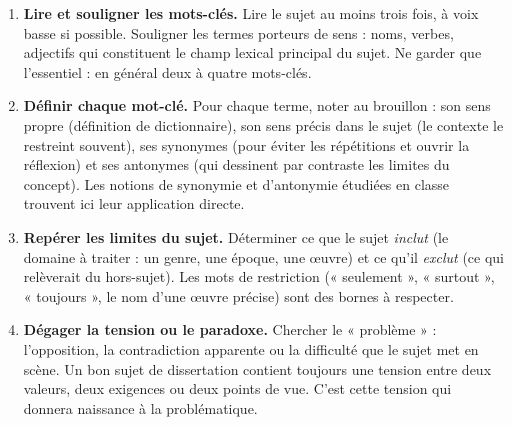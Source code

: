 \documentclass[11pt]{article}
\begin{document}
\begin{methode}
\begin{enumerate}
\item \textbf{Lire et souligner les mots-clés.} Lire le sujet au moins trois fois, à voix basse si possible. Souligner les termes porteurs de sens : noms, verbes, adjectifs qui constituent le champ lexical principal du sujet. Ne garder que l'essentiel : en général deux à quatre mots-clés.
\item \textbf{Définir chaque mot-clé.} Pour chaque terme, noter au brouillon : son sens propre (définition de dictionnaire), son sens précis dans le sujet (le contexte le restreint souvent), ses synonymes (pour éviter les répétitions et ouvrir la réflexion) et ses antonymes (qui dessinent par contraste les limites du concept). Les notions de synonymie et d'antonymie étudiées en classe trouvent ici leur application directe.
\item \textbf{Repérer les limites du sujet.} Déterminer ce que le sujet \emph{inclut} (le domaine à traiter : un genre, une époque, une œuvre) et ce qu'il \emph{exclut} (ce qui relèverait du hors-sujet). Les mots de restriction (« seulement », « surtout », « toujours », le nom d'une œuvre précise) sont des bornes à respecter.
\item \textbf{Dégager la tension ou le paradoxe.} Chercher le « problème » : l'opposition, la contradiction apparente ou la difficulté que le sujet met en scène. Un bon sujet de dissertation contient toujours une tension entre deux valeurs, deux exigences ou deux points de vue. C'est cette tension qui donnera naissance à la problématique.
\end{enumerate}
\end{methode}
\end{document}

